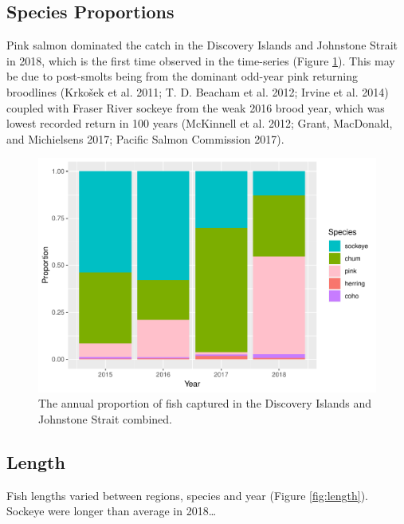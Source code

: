 \documentclass[fleqn,10pt]{wlpeerj} %
\begin{document}
\subsection*{Species Proportions}\label{species-proportions}

Pink salmon dominated the catch in the Discovery Islands and Johnstone
Strait in 2018, which is the first time observed in the time-series
(Figure \ref{fig:prop}). This may be due to post-smolts being from the
dominant odd-year pink returning broodlines (Krkošek et al. 2011; T. D.
Beacham et al. 2012; Irvine et al. 2014) coupled with Fraser River
sockeye from the weak 2016 brood year, which was lowest recorded return
in 100 years (McKinnell et al. 2012; Grant, MacDonald, and Michielsens
2017; Pacific Salmon Commission 2017).

\begin{figure}
\includegraphics[width=0.8\linewidth]{peer_j_migration_dynamics_files/figure-latex/prop-1} \caption{The annual proportion of fish captured in the Discovery Islands and Johnstone Strait combined.}\label{fig:prop}
\end{figure}

\subsection*{Length}\label{length}

Fish lengths varied between regions, species and year (Figure
\ref{fig:length}). Sockeye were longer than average in 2018\ldots{}
\end{document}
